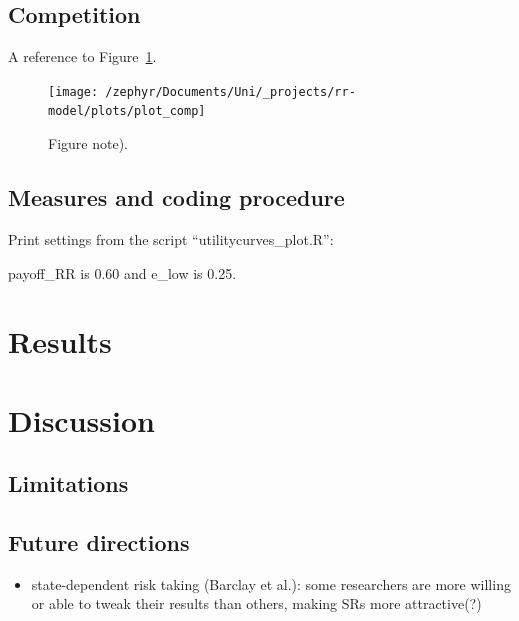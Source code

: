 \documentclass[british,,man,floatsintext]{apa6}
\providecommand{\tightlist}{%
  \setlength{\itemsep}{0pt}\setlength{\parskip}{0pt}}
\begin{document}
\hypertarget{competition}{%
\subsection{Competition}\label{competition}}

A reference to Figure~\ref{fig:competitionplot}.



\begin{figure}
\texttt{[image: /zephyr/Documents/Uni/\_projects/rr-model/plots/plot\_comp]} \caption{Figure note).}\label{fig:competitionplot}
\end{figure}

\hypertarget{measures-and-coding-procedure}{%
\subsection{Measures and coding procedure}\label{measures-and-coding-procedure}}

Print settings from the script \enquote{utilitycurves\_plot.R}:

payoff\_RR is \(0.60\) and e\_low is 0.25.

\hypertarget{results-1}{%
\section{Results}\label{results-1}}

\hypertarget{discussion}{%
\section{Discussion}\label{discussion}}

\hypertarget{limitations}{%
\subsection{Limitations}\label{limitations}}

\hypertarget{future-directions}{%
\subsection{Future directions}\label{future-directions}}

\begin{itemize}
\tightlist
\item
  state-dependent risk taking (Barclay et al.): some researchers are more willing or able to tweak their results than others, making SRs more attractive(?)
\end{itemize}
\end{document}

